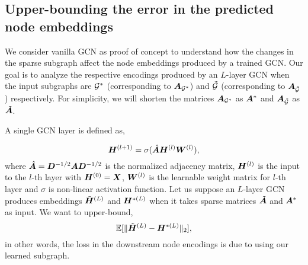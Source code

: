 \subsection{Upper-bounding the error in the predicted node embeddings}
\label{theo:gcnembed}
We consider vanilla GCN as proof of concept to understand how the changes in the sparse subgraph affect the node embeddings produced by a trained GCN. Our goal is to analyze the respective encodings produced by an $L$-layer GCN when the input subgraphs are ${\mathcal{G}}^*$ (corresponding to ${\bm{A}}_{{\mathcal{G}}^*}$) and $\tilde{{\mathcal{G}}}$ (corresponding to ${\bm{A}}_{\tilde{{\mathcal{G}}}}$) respectively. For simplicity, we will shorten the matrices ${\bm{A}}_{{\mathcal{G}}^*}$ as ${\bm{A}}^*$ and ${\bm{A}}_{\tilde{{\mathcal{G}}}}$ as ${\tilde{{\bm{A}}}}$. 

A single GCN layer is defined as,

\[
{\bm{H}}^{(l+1)} = \sigma(\hat{{\bm{A}}}{\bm{H}}^{(l)}{\bm{W}}^{(l)}),
\]
where $\hat{{\bm{A}}} = {\bm{D}}^{-1/2}{\bm{A}}{\bm{D}}^{-1/2}$ is the normalized adjacency matrix, ${\bm{H}}^{(l)}$ is the input to the $l$-th layer with ${\bm{H}}^{(0)} = {\bm{X}}$, ${\bm{W}}^{(l)}$ is the learnable weight matrix for $l$-th layer and $\sigma$ is non-linear activation function. Let us suppose an $L$-layer GCN produces embeddings ${\tilde{{\bm{H}}}}^{(L)}$ and ${\bm{H}}^{*(L)}$ when it takes sparse matrices ${\tilde{{\bm{A}}}}$ and ${\bm{A}}^*$ as input. We want to upper-bound,
\[
\mathbb{E}[\| {\tilde{{\bm{H}}}}^{(L)} - {\bm{H}}^{*(L)} \|_{2}],
\]
in other words, the loss in the downstream node encodings is due to using our learned subgraph. 


